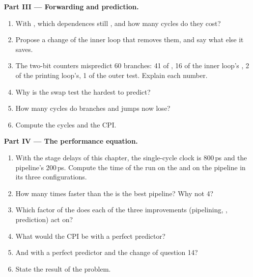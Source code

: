 \begin{problem}
\medskip\noindent\textbf{Part III --- Forwarding and prediction.}\par\nopagebreak
\begin{enumerate}[resume, beginpenalty=10000]
\item With , which dependences still , and how many cycles do they cost?
\item Propose a change of the inner loop that removes them, and say what else it saves.
\item The two-bit counters mispredict 60 branches: 41 of , 16 of the inner loop's
, 2 of the printing loop's, 1 of the outer test. Explain each number.
\item Why is the swap test the hardest to predict?
\item How many cycles do branches and jumps now lose?
\item Compute the cycles and the CPI.
\end{enumerate}

\medskip\noindent\textbf{Part IV --- The performance equation.}\par\nopagebreak
\begin{enumerate}[resume, beginpenalty=10000]
\item With the stage delays of this chapter, the single-cycle clock is 800\,ps and the pipeline's 200\,ps. Compute the
time of the run on the  and on the pipeline in its three configurations.
\item How many times faster than the  is the best pipeline? Why not 4?
\item Which factor of the  does each of the three improvements (pipelining, ,
prediction) act on?
\item What would the CPI be with a perfect predictor?
\item And with a perfect predictor and the change of question 14?
\item State the result of the problem.
\end{enumerate}
\end{problem}
